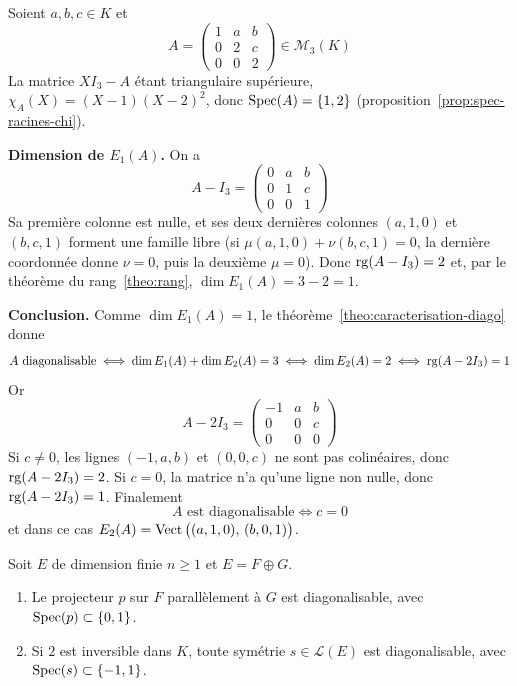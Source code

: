 \begin{exemple}
Soient $a,b,c\in K$ et
\[A = \begin{pmatrix} 1 & a & b \\ 0 & 2 & c \\ 0 & 0 & 2\end{pmatrix} \in \mathcal{M}_3(K)\]
La matrice $XI_3-A$ étant triangulaire supérieure, $\chi_A(X)=(X-1)(X-2)^2$, donc $\operatorname{Spec}(A)=\{1,2\}$ (proposition~\ref{prop:spec-racines-chi}).

\textbf{Dimension de $E_1(A)$.} On a
\[A-I_3 = \begin{pmatrix} 0 & a & b \\ 0 & 1 & c \\ 0 & 0 & 1\end{pmatrix}\]
Sa première colonne est nulle, et ses deux dernières colonnes $(a,1,0)$ et $(b,c,1)$ forment une famille libre (si $\mu(a,1,0)+\nu(b,c,1)=0$, la dernière coordonnée donne $\nu=0$, puis la deuxième $\mu=0$). Donc $\operatorname{rg}(A-I_3)=2$ et, par le théorème du rang~\ref{theo:rang}, $\dim E_1(A)=3-2=1$.

\textbf{Conclusion.} Comme $\dim E_1(A)=1$, le théorème~\ref{theo:caracterisation-diago} donne
\[A \text{ diagonalisable} \iff \dim E_1(A)+\dim E_2(A)=3 \iff \dim E_2(A)=2 \iff \operatorname{rg}(A-2I_3)=1\]
Or
\[A-2I_3 = \begin{pmatrix} -1 & a & b \\ 0 & 0 & c \\ 0 & 0 & 0\end{pmatrix}\]
Si $c\neq 0$, les lignes $(-1,a,b)$ et $(0,0,c)$ ne sont pas colinéaires, donc $\operatorname{rg}(A-2I_3)=2$. Si $c=0$, la matrice n'a qu'une ligne non nulle, donc $\operatorname{rg}(A-2I_3)=1$. Finalement
\[A \text{ est diagonalisable} \iff c=0\]
et dans ce cas $E_2(A)=\operatorname{Vect}\big((a,1,0),\,(b,0,1)\big)$.
\end{exemple}

\begin{coro}
\label{coro:proj-sym-diago}
Soit $E$ de dimension finie $n\geq 1$ et $E=F\oplus G$.
\begin{enumerate}
\item Le projecteur $p$ sur $F$ parallèlement à $G$ est diagonalisable, avec $\operatorname{Spec}(p)\subset\{0,1\}$.
\item Si $2$ est inversible dans $K$, toute symétrie $s\in\mathcal{L}(E)$ est diagonalisable, avec $\operatorname{Spec}(s)\subset\{-1,1\}$.
\end{enumerate}
\end{coro}

